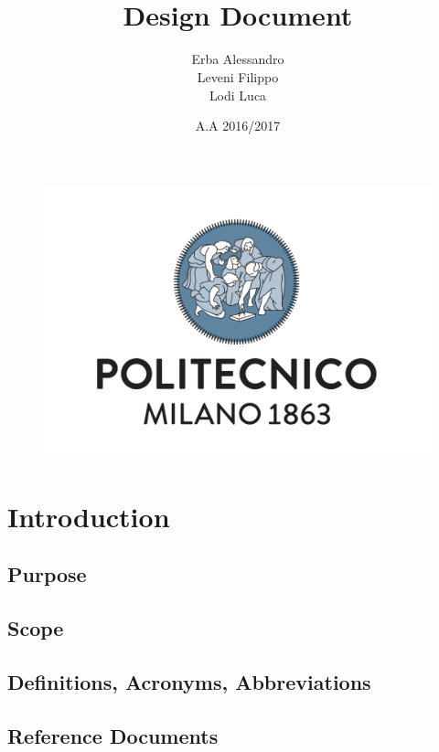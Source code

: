 \documentclass[english]{article}
\begin{document}
\begin{figure}
	\centering
	\includegraphics[scale=0.5]{logo.pdf} 
\end{figure}


\title{\powerenjoy\\
Design Document\\
}

\date{A.A 2016/2017}

\author{Erba Alessandro\\
 Leveni Filippo\\
 Lodi Luca}

\maketitle
\pagebreak{}

\tableofcontents{} \pagebreak{}
\section{Introduction}
	\subsection{Purpose}
	\subsection{Scope}
	\subsection{Definitions, Acronyms, Abbreviations}
	\subsection{Reference Documents}
\end{document}
